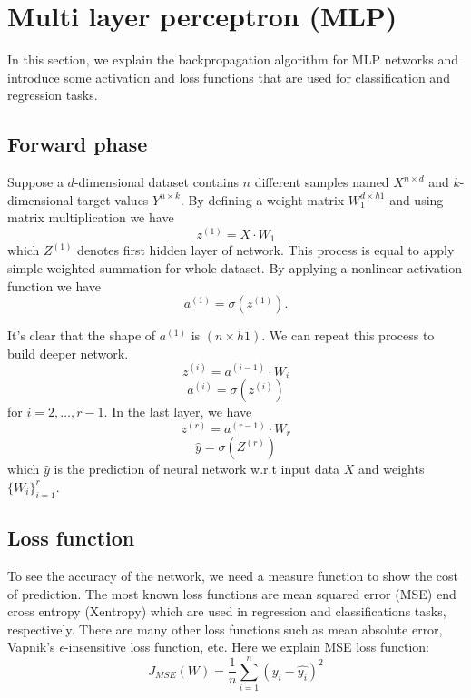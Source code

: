 \documentclass[10pt]{SelfArx} %
\begin{document}
	
	
	\section{Multi layer perceptron (MLP)}
	In this section, we explain the backpropagation algorithm for MLP networks and introduce some activation and loss functions that are used for classification and regression tasks. 
	
	\subsection{Forward phase}
	Suppose a $d$-dimensional dataset contains $n$ different samples named $X^{n\times d}$ and $k$-dimensional target values $Y^{n\times k}$. By defining a weight matrix $W_{1}^{d\times h1}$ and using matrix multiplication we have
	\begin{equation}
	z^{(1)} = X \cdot W_1
	\end{equation}
	which $Z^{(1)}$ denotes first hidden layer of network. This process is equal to apply simple weighted summation for whole dataset. By applying a nonlinear activation function we have
	\begin{equation}
	a^{(1)} = \sigma(z^{(1)}).
	\end{equation}
	
	It's clear that the shape of $a^{(1)}$ is $(n \times h1)$. We can repeat this process to build deeper network.
	\begin{equation}
	z^{(i)} = a^{(i-1)} \cdot W_i 
	\end{equation}
	\begin{equation}
	a^{(i)} = \sigma(z^{(i)})
	\end{equation}
	for $i=2,\ldots,r-1$. In the last layer, we have
	\begin{equation}
	z^{(r)} = a^{(r-1)} \cdot W_r
	\end{equation}
	\begin{equation}
	\hat{y} = \sigma(Z^{(r)})
	\end{equation}
	which $\hat{y}$ is the prediction of neural network w.r.t input data $X$ and weights $\{W_i\}_{i=1}^r$.
	
	\subsection{Loss function}
	To see the accuracy of the network, we need a measure function to show the cost of prediction. The most known loss functions are mean squared error (MSE) end cross entropy (Xentropy) which are used in regression and classifications tasks, respectively. There are many other loss functions such as mean absolute error, Vapnik's $\epsilon$-insensitive loss function, etc. Here we explain MSE loss function:
	\begin{equation}
	J_{MSE}(W) ={\frac {1}{n}}\sum\limits_{i=1}^{n}(y_{i}-{\hat {y_{i}}})^{2}
	\end{equation}
	
\end{document}
